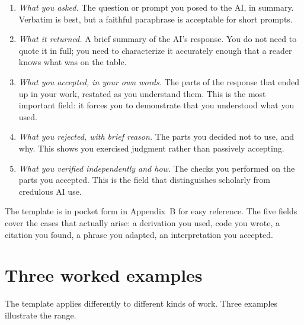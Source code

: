 \documentclass[11pt]{book}
\begin{document}
\begin{tryit}
\begin{enumerate}\setlength{\itemsep}{3pt}
\item \emph{What you asked.} The question or prompt you posed to the AI, in summary. Verbatim is best, but a faithful paraphrase is acceptable for short prompts.
\item \emph{What it returned.} A brief summary of the AI's response. You do not need to quote it in full; you need to characterize it accurately enough that a reader knows what was on the table.
\item \emph{What you accepted, in your own words.} The parts of the response that ended up in your work, restated as you understand them. This is the most important field: it forces you to demonstrate that you understood what you used.
\item \emph{What you rejected, with brief reason.} The parts you decided not to use, and why. This shows you exercised judgment rather than passively accepting.
\item \emph{What you verified independently and how.} The checks you performed on the parts you accepted. This is the field that distinguishes scholarly from credulous AI use.
\end{enumerate}
\end{tryit}

The template is in pocket form in Appendix~B for easy reference. The five fields cover the cases that actually arise: a derivation you used, code you wrote, a citation you found, a phrase you adapted, an interpretation you accepted.

\section{Three worked examples}

The template applies differently to different kinds of work. Three examples illustrate the range.
\end{document}
